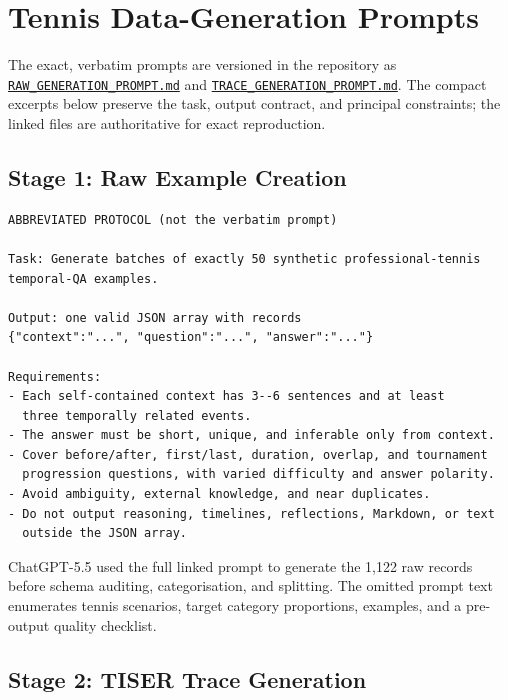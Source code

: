 \documentclass[conference]{IEEEtran}
\begin{document}
\clearpage
\onecolumn
\appendices

\section{Tennis Data-Generation Prompts}
\label{app:tennis-prompts}

The exact, verbatim prompts are versioned in the repository as
\href{https://github.com/thestbobo/tiser_temporal_reasoning_extension/blob/main/docs/extensions/tennis_domain_adaptation/RAW_GENERATION_PROMPT.md}{\texttt{RAW\_GENERATION\_PROMPT.md}} and
\href{https://github.com/thestbobo/tiser_temporal_reasoning_extension/blob/main/docs/extensions/tennis_domain_adaptation/TRACE_GENERATION_PROMPT.md}{\texttt{TRACE\_GENERATION\_PROMPT.md}}.
The compact excerpts below preserve the task, output contract, and principal constraints; the linked files are authoritative for exact reproduction.

\subsection{Stage 1: Raw Example Creation}

\begin{lstlisting}[style=prompt]
ABBREVIATED PROTOCOL (not the verbatim prompt)

Task: Generate batches of exactly 50 synthetic professional-tennis
temporal-QA examples.

Output: one valid JSON array with records
{"context":"...", "question":"...", "answer":"..."}

Requirements:
- Each self-contained context has 3--6 sentences and at least
  three temporally related events.
- The answer must be short, unique, and inferable only from context.
- Cover before/after, first/last, duration, overlap, and tournament
  progression questions, with varied difficulty and answer polarity.
- Avoid ambiguity, external knowledge, and near duplicates.
- Do not output reasoning, timelines, reflections, Markdown, or text
  outside the JSON array.
\end{lstlisting}

ChatGPT-5.5 used the full linked prompt to generate the 1,122 raw records before schema auditing, categorisation, and splitting. The omitted prompt text enumerates tennis scenarios, target category proportions, examples, and a pre-output quality checklist.

\subsection{Stage 2: TISER Trace Generation}
\end{document}
